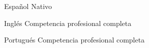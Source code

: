 

\begin{cvskills}

  \cvskill
    {Español} %
    {Nativo} %

  \cvskill
    {Inglés} %
    {Competencia profesional completa} %

  \cvskill
    {Portugués} %
    {Competencia profesional completa} %

\end{cvskills}
